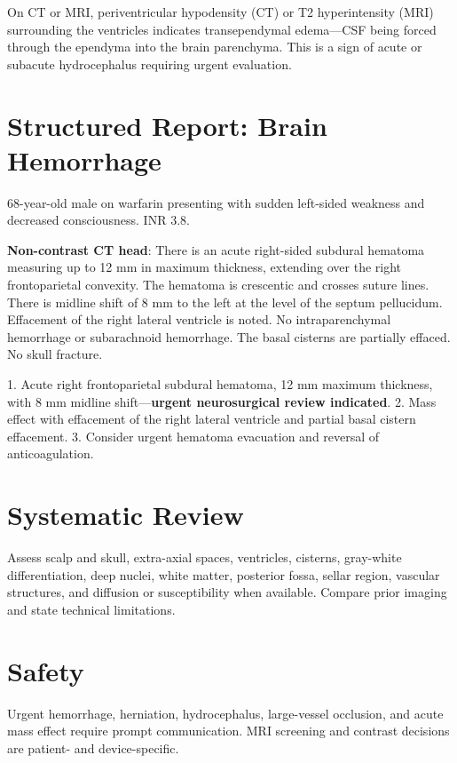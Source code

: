 \begin{pearlbox}
On CT or MRI, periventricular hypodensity (CT) or T2 hyperintensity (MRI) surrounding the ventricles indicates transependymal edema---CSF being forced through the ependyma into the brain parenchyma. This is a sign of acute or subacute hydrocephalus requiring urgent evaluation.
\end{pearlbox}


\section{Structured Report: Brain Hemorrhage}

\begin{testbox}[Indications:]
68-year-old male on warfarin presenting with sudden left-sided weakness and decreased consciousness. INR 3.8.
\end{testbox}
\begin{refbox}[Findings:]
\textbf{Non-contrast CT head}: There is an acute right-sided subdural hematoma measuring up to 12 mm in maximum thickness, extending over the right frontoparietal convexity. The hematoma is crescentic and crosses suture lines. There is midline shift of 8 mm to the left at the level of the septum pellucidum. Effacement of the right lateral ventricle is noted. No intraparenchymal hemorrhage or subarachnoid hemorrhage. The basal cisterns are partially effaced. No skull fracture.
\end{refbox}
\begin{pearlbox}[Impression:]
1. Acute right frontoparietal subdural hematoma, 12 mm maximum thickness, with 8 mm midline shift---\textbf{urgent neurosurgical review indicated}.
2. Mass effect with effacement of the right lateral ventricle and partial basal cistern effacement.
3. Consider urgent hematoma evacuation and reversal of anticoagulation.
\end{pearlbox}


\section{Systematic Review}
Assess scalp and skull, extra-axial spaces, ventricles, cisterns, gray-white differentiation, deep nuclei, white matter, posterior fossa, sellar region, vascular structures, and diffusion or susceptibility when available. Compare prior imaging and state technical limitations.

\section{Safety}
Urgent hemorrhage, herniation, hydrocephalus, large-vessel occlusion, and acute mass effect require prompt communication. MRI screening and contrast decisions are patient- and device-specific.

\clearpage
